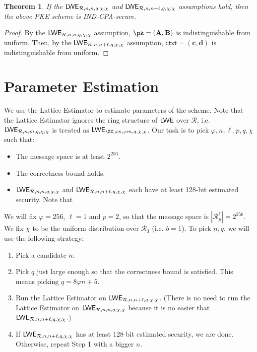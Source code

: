 \documentclass[a4paper,10pt]{article}
\renewcommand{\vec}[1]{\ensuremath{\mathbf{#1}}\xspace}
\newcommand{\mat}[1]{\ensuremath{\mathbf{#1}}\xspace}
\newcommand{\ring}{\mathcal{R}}
\newcommand{\LWE}[1]%
{\ifthenelse{\equal{#1}{}}%
  {\ensuremath{\mathsf{LWE}}}%
  {\ensuremath{\mathsf{LWE}_{\/#1}}}%
  \xspace%
}
\newcommand{\ctxt}{\mathsf{ctxt}}
\newtheorem{theorem}[definition]{Theorem}
\begin{document}
\begin{theorem}
  If the $\LWE{\ring,n,n,q,\chi,\chi}$ and $\LWE{\ring,n,n+\ell,q,\chi,\chi}$ assumptions hold, then the above PKE scheme is IND-CPA-secure.
\end{theorem}

\begin{proof}
  By the $\LWE{\ring,n,n,q,\chi,\chi}$ assumption, $\pk = (\mat{A}, \mat{B})$ is indistinguishable from uniform.
  Then, by the $\LWE{\ring,n,n+\ell,q,\chi,\chi}$ assumption, $\ctxt = (\vec{c}, \vec{d})$ is indistinguishable from uniform.
\end{proof}

\section{Parameter Estimation}

We use the Lattice Estimator to estimate parameters of the scheme. 
Note that the Lattice Estimator ignores the ring structure of $\LWE{}$ over $\ring$, i.e. $\LWE{\ring,n,m,q,\chi,\chi}$ is treated as $\LWE{\ZZ,\varphi n,\varphi m,q,\chi,\chi}$.
Our task is to pick $\varphi, n, \ell, p, q, \chi$ such that: 
\begin{itemize}
  \item The message space is at least $2^{256}$.
  \item The correctness bound holds. 
  \item $\LWE{\ring,n,n,q,\chi,\chi}$ and $\LWE{\ring,n,n+\ell,q,\chi,\chi}$ each have at least 128-bit estimated security.  Note that 
\end{itemize}

We will fix $\varphi = 256$, $\ell = 1$ and $p = 2$, so that the message space is $|\ring_p^\ell| = 2^{256}$.
We fix $\chi$ to be the uniform distribution over $\ring_3$ (i.e. $b = 1$).  
To pick $n, q$, we will use the following strategy: 
\begin{enumerate}
  \item Pick a candidate $n$.
  \item Pick $q$ just large enough so that the correctness bound is satisfied. This means picking $q = 8 \varphi n + 5$. 
  \item Run the Lattice Estimator on $\LWE{\ring,n,n+\ell,q,\chi,\chi}$. (There is no need to run the Lattice Estimator on $\LWE{\ring,n,n,q,\chi,\chi}$ because it is no easier that $\LWE{\ring,n,n+\ell,q,\chi,\chi}$.)
  \item If $\LWE{\ring,n,n+\ell,q,\chi,\chi}$ has at least 128-bit estimated security, we are done. Otherwise, repeat Step 1 with a bigger $n$.
\end{enumerate}


\clearpage



\appendix
\clearpage
\end{document}
